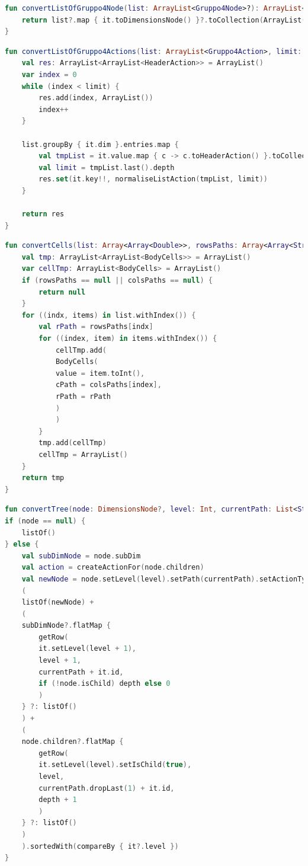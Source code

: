\begin{lstlisting}[caption={Funzione convertListOfGruppo4Node()}, label={lst:bodycells}, language=Kotlin]
fun convertListOfGruppo4Node(list: ArrayList<Gruppo4Node>?): ArrayList<DimensionsNode>? {
	return list?.map { it.toDimensionsNode() }?.toCollection(ArrayList())
}
\end{lstlisting}

\begin{lstlisting}[caption={Funzione convertListOfGruppo4Actions()}, label={lst:bodycells}, language=Kotlin]
fun convertListOfGruppo4Actions(list: ArrayList<Gruppo4Action>, limit: Int): ArrayList<ArrayList<HeaderAction>> {
	val res: ArrayList<ArrayList<HeaderAction>> = ArrayList()
	var index = 0
	while (index < limit) {
		res.add(index, ArrayList())
		index++
	}
	
	list.groupBy { it.dim }.entries.map {
		val tmpList = it.value.map { c -> c.toHeaderAction() }.toCollection(ArrayList())
		val limit = tmpList.last().depth
		res.set(it.key!!, normaliseListAction(tmpList, limit))
	}
	
	return res
}
\end{lstlisting}

\begin{lstlisting}[caption={Funzione convertCells()}, label={lst:bodycells}, language=Kotlin]
fun convertCells(list: Array<Array<Double>>, rowsPaths: Array<Array<String>>? , colsPaths: Array<Array<String>>?): ArrayList<ArrayList<BodyCells>>? {
	val tmp: ArrayList<ArrayList<BodyCells>> = ArrayList()
	var cellTmp: ArrayList<BodyCells> = ArrayList()
	if (rowsPaths == null || colsPaths == null) {
		return null
	}
	for ((indx, items) in list.withIndex()) {
		val rPath = rowsPaths[indx]
		for ((index, item) in items.withIndex()) {
			cellTmp.add(
			BodyCells(
			value = item.toInt(),
			cPath = colsPaths[index],
			rPath = rPath
			)
			)
		}
		tmp.add(cellTmp)
		cellTmp = ArrayList()
	}
	return tmp
}
\end{lstlisting}

\begin{lstlisting}[caption={Funzione convertTree()}, label={lst:bodycells}, language=Kotlin]
fun convertTree(node: DimensionsNode?, level: Int, currentPath: List<String>, depth: Int): List<DimensionsNode?> =
if (node == null) {
	listOf()
} else {
	val subDimNode = node.subDim
	val action = createActionFor(node.children)
	val newNode = node.setLevel(level).setPath(currentPath).setActionType(action).setDepth(depth)
	(
	listOf(newNode) +
	(
	subDimNode?.flatMap {
		getRow(
		it.setLevel(level + 1),
		level + 1,
		currentPath + it.id,
		if (!node.isChild) depth else 0
		)
	} ?: listOf()
	) +
	(
	node.children?.flatMap {
		getRow(
		it.setLevel(level).setIsChild(true),
		level,
		currentPath.dropLast(1) + it.id,
		depth + 1
		)
	} ?: listOf()
	)
	).sortedWith(compareBy { it?.level })
}
\end{lstlisting}

